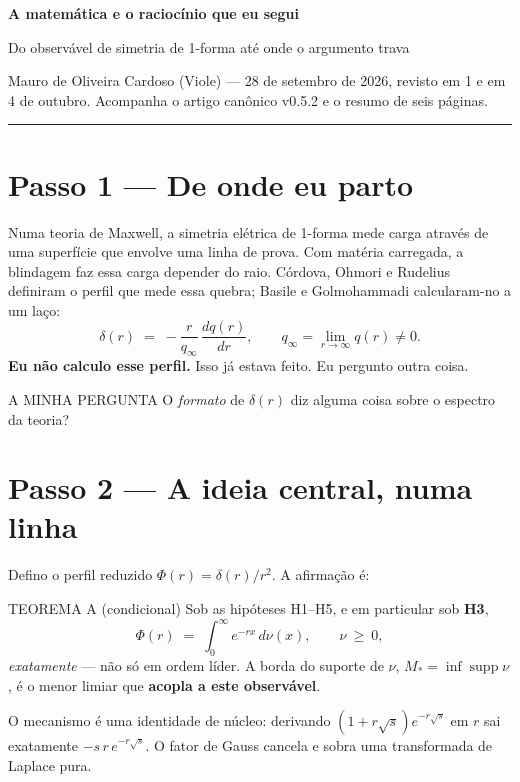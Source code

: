 \documentclass[11pt,a4paper]{article}
\newcommand{\Mst}{M_*}
\begin{document}
{\Large\bfseries\color{ink} A matemática e o raciocínio que eu segui}\par
{\large Do observável de simetria de 1-forma até onde o argumento trava}\par
\vspace{1mm}
{\small Mauro de Oliveira Cardoso (Viole) --- 28 de setembro de 2026,
revisto em 1 e em 4 de outubro. Acompanha o artigo canônico v0.5.2 e o resumo
de seis páginas.}

\vspace{2mm}\hrule\vspace{2mm}

\section*{Passo 1 --- De onde eu parto}

Numa teoria de Maxwell, a simetria elétrica de 1-forma mede carga através de
uma superfície que envolve uma linha de prova. Com matéria carregada, a
blindagem faz essa carga depender do raio. Córdova, Ohmori e Rudelius
definiram o perfil que mede essa quebra; Basile e Golmohammadi calcularam-no a
um laço:
\[
  \delta(r) \;=\; -\frac{r}{q_\infty}\,\frac{dq(r)}{dr},
  \qquad q_\infty=\lim_{r\to\infty}q(r)\neq 0 .
\]
\textbf{Eu não calculo esse perfil.} Isso já estava feito. Eu pergunto outra
coisa.

\begin{caixa}{A MINHA PERGUNTA}
O \emph{formato} de $\delta(r)$ diz alguma coisa sobre o espectro da teoria?
\end{caixa}

\section*{Passo 2 --- A ideia central, numa linha}

Defino o perfil reduzido $\Phi(r)=\delta(r)/r^2$. A afirmação é:

\begin{caixa}{TEOREMA A (condicional)}
Sob as hipóteses H1--H5, e em particular sob \textbf{H3},
\[
  \Phi(r)\;=\;\int_0^\infty e^{-rx}\,d\nu(x),\qquad \nu\ \ge\ 0,
\]
\emph{exatamente} --- não só em ordem líder. A borda do suporte de $\nu$,
$\Mst=\inf\operatorname{supp}\nu$, é o menor limiar que \textbf{acopla a este
observável}.
\end{caixa}

O mecanismo é uma identidade de núcleo: derivando
$(1+r\sqrt{s})e^{-r\sqrt{s}}$ em $r$ sai exatamente $-s\,r\,e^{-r\sqrt{s}}$.
O fator de Gauss cancela e sobra uma transformada de Laplace pura.
\end{document}
